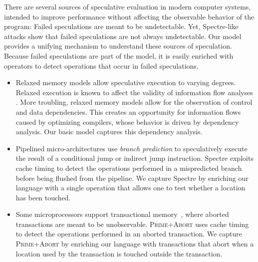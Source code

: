 \documentclass[conference]{IEEEtran}
\theoremstyle{plain}
\theoremstyle{definition}
\begin{document}
There are several sources of speculative evaluation in modern computer
systems, intended to improve performance without affecting the observable
behavior of the program: Failed speculations are meant to be
undetectable. Yet, Spectre-like attacks show that failed speculations are not
always undetectable.  Our model provides a unifying mechanism to understand
these sources of speculation.  Because failed speculations are part of the
model, it is easily enriched with operators to detect operations that occur
in failed speculations.
\begin{itemize}
\item Relaxed memory models
  \cite{SparcV9,Manson:2005:JMM:1047659.1040336,Boehm:2008:FCC:1375581.1375591,DBLP:conf/popl/ZhaoNMZ12}
  allow speculative execution to varying degrees. Relaxed execution
  is known to affect the validity of information flow analyses
  \cite{6957104,Vaughan:2012:SIF}.  More troubling, relaxed memory models
  allow for the observation of control and data dependencies. This creates an
  opportunity for information flows caused by optimizing compilers, whose
  behavior is driven by dependency analysis.  Our basic model captures this
  dependency analysis.
\item Pipelined micro-architectures use \emph{branch prediction}
  to speculatively execute the result of
  a conditional jump or indirect jump instruction.
  Spectre \cite{DBLP:journals/corr/abs-1801-01203} exploits
  cache timing to detect the operations performed in a mispredicted branch
  before being flushed from the pipeline.  We capture Spectre by enriching
  our language with a single operation that allows one to test whether a
  location has been touched. %
\item Some microprocessors support transactional
  memory~\cite{ChongSW18}, where aborted transactions are meant to be
  unobservable.  \textsc{Prime+Abort}
  \cite{DBLP:conf/uss/DisselkoenKPT17} uses cache timing to detect the
  operations performed in an aborted transaction.  We capture \textsc{Prime+Abort} by enriching
  our language with transactions that abort when a location used by the
  transaction is touched outside the transaction.
\end{itemize}
\end{document}
